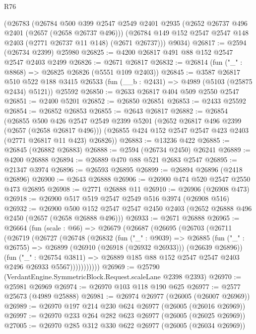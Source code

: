 \begin{lexlean}{R76}
\begin{coremodule}
    (@26783
      (@26784
        @500
        @399
        @2547
        @2549
        @2401
        @2935
        (@2652 @26737 @496 @2401 (@2657 (@2658 @26737 @496)))
        (@26784 @149 @152 @2547 @2547 @148 @2403 (@2771 @26737 @11 @148) (@2671 @26737)))
      @9034)
@26817 := @2594 (@26734 @2399) @25980
@26825 := @4200 @26817 @491 @88 @152 @2547 @2547 @2403 @2499
@26826 := @2671 @26817
@26832 := @26814 (fun ("_" : @8868) => @26825 @26826 (@5551 @109 @2403))
@26845 := @3587
    @26817
    @510
    @522
    @188
    @3415
    @26533
    (fun (__b : @2431) => @4989 (@5103 (@25875 @2434) @5121))
    @25592
@26850 := @2633 @26817 @404 @509 @2550 @2547
@26851 := @2400 @5201
@26852 := @26850 @26851
@26853 := @2433 @25592
@26854 := @26852 @26853
@26855 := @2643 @26817
@26882 := @26854
    (@26855
      @500
      @426
      @2547
      @2549
      @2399
      @5201
      (@2652 @26817 @496 @2399 (@2657 (@2658 @26817 @496)))
      (@26855 @424 @152 @2547 @2547 @423 @2403 (@2771 @26817 @11 @423) @26826))
@26883 := @13236 @422
@26885 := @26845 (@26882 @26883)
@26888 := @2594 (@26734 @2450) @26241
@26889 := @4200 @26888
@26894 := @26889 @470 @88 @521 @2683 @2547
@26895 := @21347 @3974
@26896 := @26593 @26895
@26899 := @26894 @26896 (@2418 @26896)
@26900 := @2643 @26888
@26906 := @26900 @474 @520 @2547 @2550 @473 @26895
@26908 := @2771 @26888 @11
@26910 := @26906 (@26908 @473)
@26918 := @26900 @517 @519 @2547 @2549 @516 @3974 (@26908 @516)
@26932 := @26900
    @500
    @152
    @2547
    @2547
    @2450
    @2403
    (@2652 @26888 @496 @2450 (@2657 (@2658 @26888 @496)))
@26933 := @2671 @26888
@26965 := @26664
    (fun (scale : @66) =>
    @26679
      (@26687
        (@26695
          (@26703
            (@26711
              (@26719
                (@26727
                  (@26748
                    (@26832
                      (fun ("_" : @9039) =>
                      @26885
                        (fun ("_" : @26755) =>
                        @26899 (@26910 (@26918 (@26932 @26933))) (@26639 @26896))
                        (fun ("_" : @26754 @3811) =>
                        @26889 @185 @88 @152 @2547 @2547 @2403 @2496 @26933 @5567)))))))))))
@26969 := @25790 (VerdantEngine.SymmetricBlock.Request.scaleLane @2398 @2393)
@26970 := @25981 @26969
@26974 := @26970 @103 @118 @190 @625
@26977 := @2577 @25673 (@4989 @25888)
@26981 := @26974 @26977 (@26005 (@26007 @26969))
@26989 := @26970 @197 @214 @230 @624 @26977 (@26005 (@26016 @26969))
@26997 := @26970 @233 @264 @282 @623 @26977 (@26005 (@26025 @26969))
@27005 := @26970 @285 @312 @330 @622 @26977 (@26005 (@26034 @26969))

\end{coremodule}
\end{lexlean}
